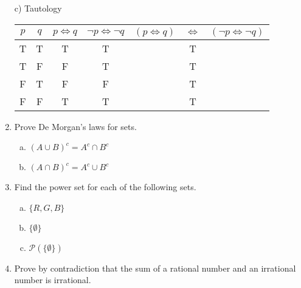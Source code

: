 \documentclass[12pt]{article}
\newif\ifsln
\renewcommand{\iff}{\Leftrightarrow}
\begin{document}
\begin{enumerate}[1.]
c) Tautology\\
\begin{tabular}{|c|c|c|c|ccc|}
\hline
$p$ & $q$ & $p \Leftrightarrow q$ & $\neg p \Leftrightarrow \neg q$ &  $(p \Leftrightarrow q)$ &$\Leftrightarrow $&$(\neg p \Leftrightarrow \neg q)$\\
\hline
T & T & T & T && T&\\
T & F & F & T &&T&\\
F & T & F & F && T&\\
F & F & T & T && T&\\
\hline
\end{tabular}
\fi



\item Prove De Morgan's laws for sets.

\begin{multicols}{3}
	\begin{enumerate}[a)]
	\item $\left ( A \cup B \right)^{c} = A^{c}\cap B^{c}$
	\item $\left ( A \cap B \right)^{c} = A^{c}\cup B^{c}$
	\end{enumerate}
\end{multicols}

\ifsln
\bigskip
\emph{Solution}\\
a) $x \in \left ( A \cup B \right)^{c} \iff x \not\in A \cup B \iff x\not\in A\text{ and } x\not\in B \iff x\in A^c \text{ and } x\in B^c \iff x \in A^c \cap B^c$.\\
b) $x \in (A\cap B)^c \iff x\not\in A\cap C \iff x\not\in A \text{ or } x\not\in B \iff x \in A^c \cup B^c$.
\fi


\item Find the power set for each of the following sets.
\begin{multicols}{3}
	\begin{enumerate}[a)]
	\item $\{ R, G, B\}$
 	\item $\{ \emptyset \} $
	\item $\mathcal{P}(\{\emptyset\}) $
	\end{enumerate}
\end{multicols}

\ifsln
\bigskip
\emph{Solution}\\
 a)  $\mathcal{P}(\{R,G,B\}) = \left\{\emptyset, \{R\}, \{G\}, \{B\}, \{R,G\}, \{R,B\}, \{G,B\}, \{R,G,B\} \right.\}$.\\
 b) $\mathcal{P}(\{\emptyset\}) = \left\{ \emptyset, \{\emptyset\}\right\}$.\\
 c) $\mathcal{P}\left(\mathcal{P}(\{\emptyset\})\right) = \left\{\emptyset, \{\emptyset\}, \{\{\emptyset\}\}, \{\emptyset, \{\emptyset\}\}  \right\} $. 
\fi
\item Prove by contradiction that the sum of a rational number and an irrational number is irrational.


\end{enumerate}
\end{document}
